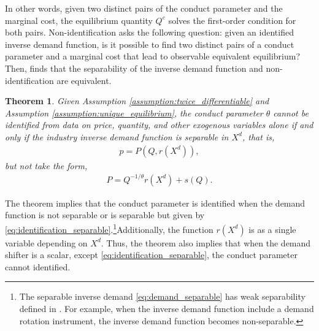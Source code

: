 \documentclass[11pt, a4paper]{article}
\newtheorem{theorem}{Theorem}
\theoremstyle{remark}
\begin{document}
In other words, given two distinct pairs of the conduct parameter and the marginal cost, the equilibrium quantity $Q^e$ solves the first-order condition for both pairs.
Non-identification asks the following question: given an identified inverse demand function, is it possible to find two distinct pairs of a conduct parameter and a marginal cost that lead to observable equivalent equilibrium?
Then, \citet{lau1982identifying} finds that the separability of the inverse demand function and non-identification are equivalent.
\begin{theorem}\label{theorem_lau}
    Given Assumption \ref{assumption:twice_differentiable} and Assumption \ref{assumption:unique_equilibrium},
    the conduct parameter $\theta$ cannot be identified from data on price, quantity, and other exogenous variables alone if and only if the industry inverse demand function is separable in $X^{d}$, that is,
    \begin{align}
        p = P(Q, r(X^{d})), \label{eq:demand_separable}
    \end{align}
    but not take the form, 
    \begin{align}
        P = Q^{-1/\theta}r(X^{d}) + s(Q). \label{eq:identification_separable}
    \end{align}
\end{theorem}
The theorem implies that the conduct parameter is identified when the demand function is not separable or is separable but given by \eqref{eq:identification_separable}.\footnote{The separable inverse demand \eqref{eq:demand_separable} has weak separability defined in \citet{goldmanNote1964}. For example, when the inverse demand function include a demand rotation instrument, the inverse demand function becomes non-separable.}Additionally, the function $r(X^{d})$ is as a single variable depending on $X^{d}$.
Thus, the theorem also implies that when the demand shifter is a scalar, except \eqref{eq:identification_separable}, the conduct parameter cannot identified.
\end{document}
